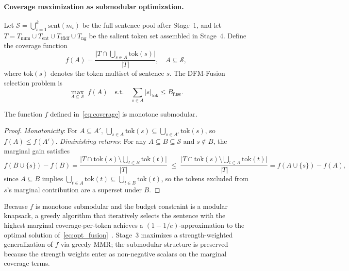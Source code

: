 \paragraph{Coverage maximization as submodular optimization.}
Let $\mathcal{S} = \bigcup_{i=1}^{k} \mathrm{sent}(m_i)$ be the full sentence pool after Stage~1, and let $T = T_{\mathrm{num}} \cup T_{\mathrm{ent}} \cup T_{\mathrm{tfidf}} \cup T_{\mathrm{ng}}$ be the salient token set assembled in Stage~4.
Define the coverage function
\begin{equation}
    f(A) = \frac{\bigl|T \cap \textstyle\bigcup_{s \in A} \mathrm{tok}(s)\bigr|}{|T|}, \quad A \subseteq \mathcal{S},
    \label{eq:coverage}
\end{equation}
where $\mathrm{tok}(s)$ denotes the token multiset of sentence $s$.
The DFM-Fusion selection problem is
\begin{equation}
    \max_{A \subseteq \mathcal{S}} \; f(A) \quad \text{s.t.} \quad \textstyle\sum_{s \in A}|s|_{\mathrm{tok}} \leq B_{\mathrm{fuse}}.
    \label{eq:opt_fusion}
\end{equation}

\begin{lemma}
\label{lem:submodular}
The function $f$ defined in~\eqref{eq:coverage} is monotone submodular.
\end{lemma}
\begin{proof}
\emph{Monotonicity}: For $A \subseteq A'$, $\bigcup_{s \in A}\mathrm{tok}(s) \subseteq \bigcup_{s \in A'}\mathrm{tok}(s)$, so $f(A) \leq f(A')$.
\emph{Diminishing returns}: For any $A \subseteq B \subseteq \mathcal{S}$ and $s \notin B$, the marginal gain satisfies
\[
  f(B \cup \{s\}) - f(B)
  = \frac{\bigl|T \cap \mathrm{tok}(s) \setminus \textstyle\bigcup_{t \in B}\mathrm{tok}(t)\bigr|}{|T|}
  \;\leq\;
  \frac{\bigl|T \cap \mathrm{tok}(s) \setminus \textstyle\bigcup_{t \in A}\mathrm{tok}(t)\bigr|}{|T|}
  = f(A \cup \{s\}) - f(A),
\]
since $A \subseteq B$ implies $\bigcup_{t \in A}\mathrm{tok}(t) \subseteq \bigcup_{t \in B}\mathrm{tok}(t)$, so the tokens excluded from $s$'s marginal contribution are a superset under $B$.
\end{proof}

Because $f$ is monotone submodular and the budget constraint is a modular knapsack, a greedy algorithm that iteratively selects the sentence with the highest marginal coverage-per-token achieves a $(1-1/e)$-approximation to the optimal solution of~\eqref{eq:opt_fusion}~\citep{Nemhauser1978AnalysisOA,Sviridenko2004ANO}.
Stage~3 maximizes a strength-weighted generalization of $f$ via greedy MMR; the submodular structure is preserved because the strength weights enter as non-negative scalars on the marginal coverage terms.

